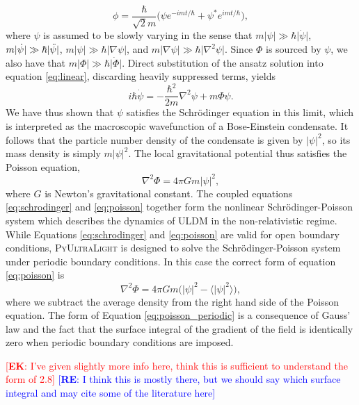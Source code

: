 \documentclass[a4paper,11pt]{article}
\newcommand{\re}[1]{\textcolor{blue}{[{\bf RE}: #1]}}
\newcommand{\ek}[1]{\textcolor{red}{[{\bf EK}: #1]}}
\newcommand{\PyUltraLight}{\textsc{PyUltraLight}\xspace}
\begin{document}
\begin{equation}\label{eq:ansatz}
    \phi=\frac{\hbar}{\sqrt{2}m}\big(\psi e^{-imt/\hbar}+\psi^* e^{imt/\hbar}\big),
\end{equation}
where $\psi$ is assumed to be slowly varying in the sense that $m\vert\psi\vert\gg\hbar\vert\dot{\psi}\vert$, $m\vert\dot{\psi}\vert\gg\hbar\vert\Ddot{\psi}\vert$, $m\vert\psi\vert\gg\hbar\vert\nabla{\psi}\vert$, and $m\vert\nabla{\psi}\vert\gg\hbar\vert\nabla^2{\psi}\vert$. Since $\Phi$ is sourced by $\psi$, we also have that $m\vert\Phi\vert\gg\hbar\vert\dot{\Phi}\vert$. Direct substitution of the ansatz solution into equation \ref{eq:linear}, discarding heavily suppressed terms, yields
\begin{equation}\label{eq:schrodinger}
    i\hbar\Dot{\psi}=-\frac{\hbar^2}{2m}\nabla^2\psi+m\Phi\psi.
\end{equation}
We have thus shown that $\psi$ satisfies the Schr{\"o}dinger equation in this limit, which is interpreted as the macroscopic wavefunction of a Bose-Einstein condensate. It follows that the particle number density of the condensate is given by $\vert\psi\vert^2$, so its mass density is simply $m\vert\psi\vert^2$. The local gravitational potential thus satisfies the Poisson equation,
\begin{equation}\label{eq:poisson}
    \nabla^2\Phi=4\pi G m \vert\psi\vert^2,
\end{equation}
where $G$ is Newton's gravitational constant. The coupled equations \ref{eq:schrodinger} and \ref{eq:poisson} together form the nonlinear Schr{\"o}dinger-Poisson system which describes the dynamics of ULDM in the non-relativistic regime. While Equations \ref{eq:schrodinger} and \ref{eq:poisson} are valid for open boundary conditions, \PyUltraLight is designed to solve the Schr{\"o}dinger-Poisson system under periodic boundary conditions. In this case the correct form of equation \ref{eq:poisson} is 
\begin{equation}\label{eq:poisson_periodic}
    \nabla^2\Phi=4\pi G m \big(\vert\psi\vert^2-\langle\vert\psi\vert^2\rangle\big),
\end{equation}
where we subtract the average density from the right hand side of the Poisson equation. The form of Equation \ref{eq:poisson_periodic} is a consequence of Gauss' law and the fact that the surface integral of the gradient of the field is identically zero when periodic boundary conditions are imposed. 

\ek{I've given slightly more info here, think this is sufficient to understand the form of 2.8} \re{I think this is mostly there, but we should say which surface integral and may cite some of the literature here}
\end{document}
